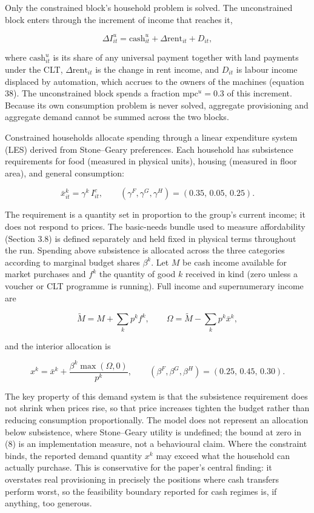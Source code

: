 \documentclass[preprint,review,12pt]{elsarticle}
\begin{document}
Only the constrained block's household problem is solved. The
unconstrained block enters through the increment of income that reaches
it,

\[\Delta I^u_{it} = \mathrm{cash}^u_{it} + \Delta \mathrm{rent}_{it} + D_{it}, \tag{5}\]

where \(\mathrm{cash}^u_{it}\) is its share of any universal payment
together with land payments under the CLT, \(\Delta \mathrm{rent}_{it}\)
is the change in rent income, and \(D_{it}\) is labour income displaced
by automation, which accrues to the owners of the machines (equation
38). The unconstrained block spends a fraction \(\mathrm{mpc}^u = 0.3\)
of this increment. Because its own consumption problem is never solved,
aggregate provisioning and aggregate demand cannot be summed across the
two blocks.

Constrained households allocate spending through a linear expenditure
system (LES) derived from Stone--Geary preferences. Each household has
subsistence requirements for food (measured in physical units), housing
(measured in floor area), and general consumption:

\[\bar{x}^k_{it} = \gamma^k \, I^c_{it}, \qquad (\gamma^F, \gamma^G, \gamma^H) = (0.35,\, 0.05,\, 0.25). \tag{6}\]

The requirement is a quantity set in proportion to the group's current
income; it does not respond to prices. The basic-needs bundle used to
measure affordability (Section 3.8) is defined separately and held fixed
in physical terms throughout the run. Spending above subsistence is
allocated across the three categories according to marginal budget
shares \(\beta^k\). Let \(M\) be cash income available for market
purchases and \(f^k\) the quantity of good \(k\) received in kind (zero
unless a voucher or CLT programme is running). Full income and
supernumerary income are

\[\tilde{M} = M + \sum_k p^k f^k, \qquad \Omega = \tilde{M} - \sum_k p^k \bar{x}^k, \tag{7}\]

and the interior allocation is

\[x^k = \bar{x}^k + \frac{\beta^k \max(\Omega, 0)}{p^k}, \qquad (\beta^F, \beta^G, \beta^H) = (0.25,\, 0.45,\, 0.30). \tag{8}\]

The key property of this demand system is that the subsistence
requirement does not shrink when prices rise, so that price increases
tighten the budget rather than reducing consumption proportionally. The
model does not represent an allocation below subsistence, where
Stone--Geary utility is undefined; the bound at zero in (8) is an
implementation measure, not a behavioural claim. Where the constraint
binds, the reported demand quantity \(x^k\) may exceed what the
household can actually purchase. This is conservative for the paper's
central finding: it overstates real provisioning in precisely the
positions where cash transfers perform worst, so the feasibility
boundary reported for cash regimes is, if anything, too generous.
\end{document}
